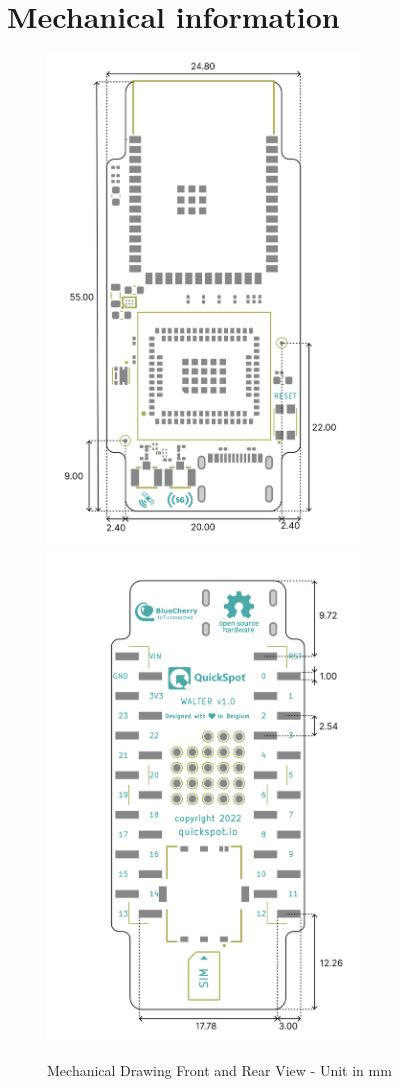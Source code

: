 \documentclass[11pt]{article}
\begin{document}
\section{Mechanical information}
\begin{figure}[h]
    \centering
    \includegraphics[height=13cm]{mechanical-front.png}
    \includegraphics[height=13cm]{mechanical-back.png}
    \caption{Mechanical Drawing Front and Rear View - Unit in mm}
    \label{fig:mechanical_front}
\end{figure}
\end{document}

